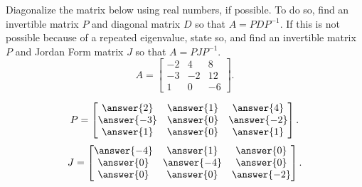 \documentclass{ximera}
\begin{document}
\begin{exercise}
    Diagonalize the matrix below using real numbers, if possible. To do so, find an invertible matrix $P$ and diagonal matrix $D$ so that $A = PDP^{-1}$. If this is not possible because of a repeated eigenvalue, state so, and find an invertible matrix $P$ and Jordan Form matrix $J$ so that $A = PJP^{-1}$. 
    \[ 
        A = 
        \begin{bmatrix} 
            -2 & 4 &8\\ 
            -3 & -2& 12\\ 
            1 & 0 & -6 
        \end{bmatrix}.
    \]
    \begin{multipleChoice}
    \end{multipleChoice}
    \begin{problem}
        \[ 
            P = 
            \begin{bmatrix} 
                \answer{2} & \answer{1} & \answer{4} \\  
                \answer{-3} & \answer{0} & \answer{-2} \\
                \answer{1} & \answer{0} & \answer{1}
            \end{bmatrix}.
        \]
        \[ 
            J = 
            \begin{bmatrix} 
                \answer{-4} & \answer{1} & \answer{0} \\  
                \answer{0} & \answer{-4} & \answer{0} \\
                \answer{0} & \answer{0} & \answer{-2}
            \end{bmatrix}.
        \]
    \end{problem}
\end{exercise} 
\end{document}
